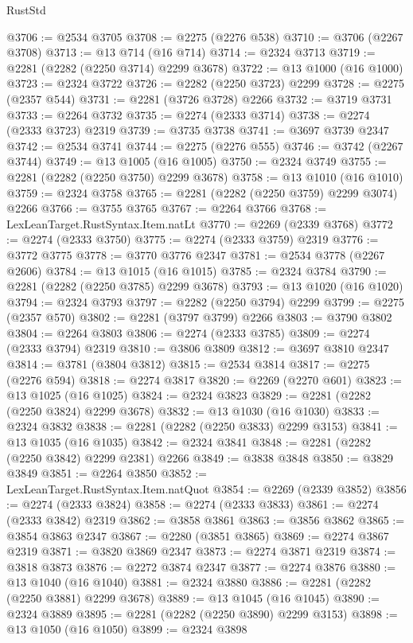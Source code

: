 \begin{lexlean}{RustStd}
\begin{coremodule}
@3706 := @2534 @3705
@3708 := @2275 (@2276 @538)
@3710 := @3706 (@2267 @3708)
@3713 := @13 @714 (@16 @714)
@3714 := @2324 @3713
@3719 := @2281 (@2282 (@2250 @3714) @2299 @3678)
@3722 := @13 @1000 (@16 @1000)
@3723 := @2324 @3722
@3726 := @2282 (@2250 @3723) @2299
@3728 := @2275 (@2357 @544)
@3731 := @2281 (@3726 @3728) @2266
@3732 := @3719 @3731
@3733 := @2264 @3732
@3735 := @2274 (@2333 @3714)
@3738 := @2274 (@2333 @3723) @2319
@3739 := @3735 @3738
@3741 := @3697 @3739 @2347
@3742 := @2534 @3741
@3744 := @2275 (@2276 @555)
@3746 := @3742 (@2267 @3744)
@3749 := @13 @1005 (@16 @1005)
@3750 := @2324 @3749
@3755 := @2281 (@2282 (@2250 @3750) @2299 @3678)
@3758 := @13 @1010 (@16 @1010)
@3759 := @2324 @3758
@3765 := @2281 (@2282 (@2250 @3759) @2299 @3074) @2266
@3766 := @3755 @3765
@3767 := @2264 @3766
@3768 := LexLeanTarget.RustSyntax.Item.natLt
@3770 := @2269 (@2339 @3768)
@3772 := @2274 (@2333 @3750)
@3775 := @2274 (@2333 @3759) @2319
@3776 := @3772 @3775
@3778 := @3770 @3776 @2347
@3781 := @2534 @3778 (@2267 @2606)
@3784 := @13 @1015 (@16 @1015)
@3785 := @2324 @3784
@3790 := @2281 (@2282 (@2250 @3785) @2299 @3678)
@3793 := @13 @1020 (@16 @1020)
@3794 := @2324 @3793
@3797 := @2282 (@2250 @3794) @2299
@3799 := @2275 (@2357 @570)
@3802 := @2281 (@3797 @3799) @2266
@3803 := @3790 @3802
@3804 := @2264 @3803
@3806 := @2274 (@2333 @3785)
@3809 := @2274 (@2333 @3794) @2319
@3810 := @3806 @3809
@3812 := @3697 @3810 @2347
@3814 := @3781 (@3804 @3812)
@3815 := @2534 @3814
@3817 := @2275 (@2276 @594)
@3818 := @2274 @3817
@3820 := @2269 (@2270 @601)
@3823 := @13 @1025 (@16 @1025)
@3824 := @2324 @3823
@3829 := @2281 (@2282 (@2250 @3824) @2299 @3678)
@3832 := @13 @1030 (@16 @1030)
@3833 := @2324 @3832
@3838 := @2281 (@2282 (@2250 @3833) @2299 @3153)
@3841 := @13 @1035 (@16 @1035)
@3842 := @2324 @3841
@3848 := @2281 (@2282 (@2250 @3842) @2299 @2381) @2266
@3849 := @3838 @3848
@3850 := @3829 @3849
@3851 := @2264 @3850
@3852 := LexLeanTarget.RustSyntax.Item.natQuot
@3854 := @2269 (@2339 @3852)
@3856 := @2274 (@2333 @3824)
@3858 := @2274 (@2333 @3833)
@3861 := @2274 (@2333 @3842) @2319
@3862 := @3858 @3861
@3863 := @3856 @3862
@3865 := @3854 @3863 @2347
@3867 := @2280 (@3851 @3865)
@3869 := @2274 @3867 @2319
@3871 := @3820 @3869 @2347
@3873 := @2274 @3871 @2319
@3874 := @3818 @3873
@3876 := @2272 @3874 @2347
@3877 := @2274 @3876
@3880 := @13 @1040 (@16 @1040)
@3881 := @2324 @3880
@3886 := @2281 (@2282 (@2250 @3881) @2299 @3678)
@3889 := @13 @1045 (@16 @1045)
@3890 := @2324 @3889
@3895 := @2281 (@2282 (@2250 @3890) @2299 @3153)
@3898 := @13 @1050 (@16 @1050)
@3899 := @2324 @3898

\end{coremodule}
\end{lexlean}
